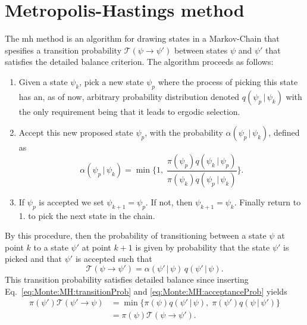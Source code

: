 \section{Metropolis-Hastings method}

The \ac{mh} method is an algorithm for drawing states in a Markov-Chain that spesifies a transition probability
$\mathcal{T}(\psi\to\psi')$ between states $\psi$ and $\psi'$ that satisfies the detailed balance criterion. The algorithm proceeds
as follows:
\begin{enumerate}
    \item Given a state $\psi_k$, pick a new state $\psi_p$ where the process of picking this state has an, as of now, arbitrary
        probability distribution denoted $q(\psi_p\,|\,\psi_k)$ with the only requirement being that it leads to ergodic selection.
    \item Accept this new proposed state $\psi_p$, with the probability $\alpha(\psi_p\,|\,\psi_k)$,
        defined as
        \begin{equation}
            \label{eq:Monte:MH:acceptanceProb}
            \alpha(\psi_p\,|\,\psi_k) = \min\bigg\{1,\;\frac{\pi(\psi_p)q(\psi_k\,|\,\psi_p)}{\pi(\psi_k)q(\psi_p\,|\,\psi_k)}\bigg\}.
        \end{equation}
    \item If $\psi_p$ is accepted we set $\psi_{k+1}=\psi_p$. If not, then $\psi_{k+1}=\psi_k$. Finally return to 1. to pick the next
        state in the chain.
\end{enumerate}
By this procedure, then the probability of transitioning between a state $\psi$ at point $k$ to a state $\psi'$ at point $k+1$ is
given by probability that the state $\psi'$ is picked and that $\psi'$ is accepted such that
\begin{equation}
    \label{eq:Monte:MH:transitionProb}
    \mathcal{T}(\psi\to\psi') = \alpha(\psi'\,|\,\psi)\,q(\psi'\,|\,\psi).
\end{equation}
This transition probability satisfies detailed balance since inserting Eq.~\eqref{eq:Monte:MH:transitionProb} and
\eqref{eq:Monte:MH:acceptanceProb} yields
\begin{equation}
    \label{eq:Monte:MH:detailedBalance}
    \begin{split}
        \pi(\psi')\mathcal{T}(\psi'\to\psi) &= \min\{\pi(\psi)q(\psi'\,|\,\psi),\;\pi(\psi')q(\psi\,|\,\psi')\}\\
        &= \pi(\psi)\mathcal{T}(\psi\to\psi').
    \end{split}
\end{equation}

